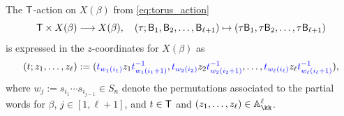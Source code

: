 \begin{lemma}\label{lem:torusaction_coordinates} The $\mathsf{T}$-action on $X(\beta)$ from \cref{eq:torus_action}
$$\mathsf{T}\times X(\beta)\longrightarrow X(\beta),\quad (\tau;\mathsf{B}_1,\mathsf{B}_2,\dots, \mathsf{B}_{\ell+1})\mapsto (\tau\mathsf{B}_1,\tau\mathsf{B}_2,\dots, \tau\mathsf{B}_{\ell+1})$$
is expressed in the $z$-coordinates for $X(\beta)$ as
$$
(t;z_1,\ldots,z_{\ell}):=(\color{blue}t_{w_1(i_{1})}\color{black}z_1\color{blue}t^{-1}_{w_1(i_{1}+1)}\color{black},\color{blue}t_{w_2(i_{2})}\color{black}z_2\color{blue}t^{-1}_{w_2(i_{2}+1)}\color{black},\ldots,\color{blue}t_{w_{\ell}(i_{\ell})}\color{black}z_{\ell}\color{blue}t^{-1}_{w_{\ell}(i_{\ell}+1)}\color{black}),
$$
\noindent where $w_j:= s_{i_1}\cdots s_{i_{j-1}}\in S_n$ denote the permutations associated to the partial words for $\beta$, $j\in[1,\ell+1]$, and $t\in\mathsf{T}$ and $(z_1,\ldots,z_{\ell})\in \mathbb{A}_\kk^{\ell}$.
\end{lemma}

